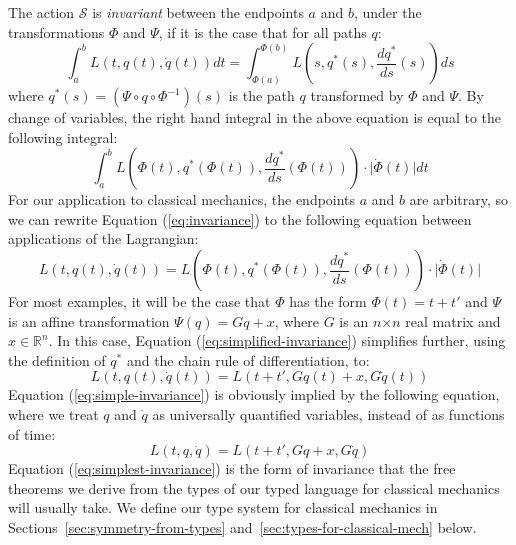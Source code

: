 \documentclass{sigplanconf}
\newcommand{\abs}[1]{\lvert #1 \rvert}
\theoremstyle{examplestyle}
\begin{document}
The action $\mathcal{S}$ is \emph{invariant} between the endpoints $a$
and $b$, under the transformations $\Phi$ and $\Psi$, if it is the
case that for all paths $q$:
\begin{equation}\label{eq:invariance}
    \int_a^b L(t,q(t),\dot{q}(t)) \mathit{dt}
    = \int_{\Phi(a)}^{\Phi(b)} L(s, q^*(s), \frac{d q^*}{ds}(s)) \mathit{ds}
\end{equation}
where $q^*(s) = (\Psi \circ q \circ \Phi^{-1})(s)$ is the path $q$
transformed by $\Phi$ and $\Psi$.  By change of variables, the right
hand integral in the above equation is equal to the following
integral:
\begin{displaymath}
  \int_a^b L(\Phi(t), q^*(\Phi(t)), \frac{d q^*}{ds}(\Phi(t)))\cdot \abs{\dot{\Phi}(t)} \mathit{dt}
\end{displaymath}
For our application to classical mechanics, the endpoints $a$ and $b$
are arbitrary, so we can rewrite Equation (\ref{eq:invariance}) to the
following equation between applications of the Lagrangian:
\begin{equation}\label{eq:simplified-invariance}
  L(t,q(t),\dot{q}(t)) = L(\Phi(t), q^*(\Phi(t)), \frac{d q^*}{ds}(\Phi(t)))\cdot \abs{\dot{\Phi}(t)}
\end{equation}
For most examples, it will be the case that $\Phi$ has the form
$\Phi(t) = t + t'$ and $\Psi$ is an affine transformation $\Psi(q)
= Gq + x$, where $G$ is an $n\mathord\times n$ real matrix and $x \in
\mathbb{R}^n$. In this case, Equation (\ref{eq:simplified-invariance})
simplifies further, using the definition of $q^*$ and the chain rule
of differentiation, to:
\begin{equation}
  \label{eq:simple-invariance}
  L(t,q(t),\dot{q}(t)) = L(t + t', Gq(t) + x, G\dot{q}(t))
\end{equation}
Equation (\ref{eq:simple-invariance}) is obviously implied by the
following equation, where we treat $q$ and $\dot{q}$ as universally
quantified variables, instead of as functions of time:
\begin{equation}
  \label{eq:simplest-invariance}
  L(t,q,\dot{q}) = L(t + t', Gq + x, G\dot{q})
\end{equation}
Equation (\ref{eq:simplest-invariance}) is the form of invariance that
the free theorems we derive from the types of our typed language for
classical mechanics will usually take. We define our type system for
classical mechanics in Sections~\ref{sec:symmetry-from-types}
and~\ref{sec:types-for-classical-mech} below.
\end{document}
